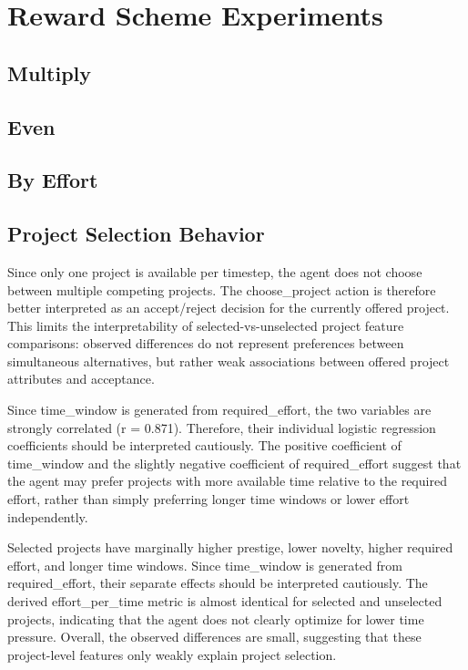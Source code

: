 \documentclass[english,bachelor]{hsluthesis}
\begin{document}
\section{Reward Scheme Experiments}
\subsection{Multiply}
\subsection{Even}
\subsection{By Effort}





\subsection{Project Selection Behavior}
Since only one project is available per timestep, the agent does not choose between multiple competing projects. The choose_project action is therefore better interpreted as an accept/reject decision for the currently offered project. This limits the interpretability of selected-vs-unselected project feature comparisons: observed differences do not represent preferences between simultaneous alternatives, but rather weak associations between offered project attributes and acceptance.

Since time\_window is generated from required\_effort, the two variables are strongly correlated (r = 0.871). Therefore, their individual logistic regression coefficients should be interpreted cautiously. The positive coefficient of time\_window and the slightly negative coefficient of required\_effort suggest that the agent may prefer projects with more available time relative to the required effort, rather than simply preferring longer time windows or lower effort independently.

Selected projects have marginally higher prestige, lower novelty, higher required effort, and longer time windows. Since time_window is generated from required_effort, their separate effects should be interpreted cautiously. The derived effort_per_time metric is almost identical for selected and unselected projects, indicating that the agent does not clearly optimize for lower time pressure. Overall, the observed differences are small, suggesting that these project-level features only weakly explain project selection.
\end{document}
